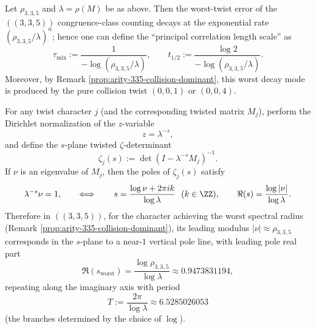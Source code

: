 \begin{remark}\label{cor:arity-335-collision-mixing-scale}
Let \(\rho_{3,3,5}\) and \(\lambda=\rho(M)\) be as above. Then the worst-twist error of the \(((3,3,5))\) congruence-class counting decays at the exponential rate
\(
(\rho_{3,3,5}/\lambda)^n
\);
hence one can define the ``principal correlation length scale'' as
$$
\tau_{\mathrm{mix}}:=\frac{1}{-\log(\rho_{3,3,5}/\lambda)},
\qquad
t_{1/2}:=\frac{\log 2}{-\log(\rho_{3,3,5}/\lambda)}.
$$
Moreover, by Remark \ref{prop:arity-335-collision-dominant}, this worst decay mode is produced by the pure collision twist $(0,0,1)$ or $(0,0,4)$.
\end{remark}

\begin{remark}\label{rem:arity-335-near1-pole-line}
For any twist character \(j\) (and the corresponding twisted matrix \(M_j\)), perform the Dirichlet normalization of the \(z\)-variable
\[
z=\lambda^{-s},
\]
and define the \(s\)-plane twisted \(\zeta\)-determinant
\[
\zeta_j(s):=\det(I-\lambda^{-s}M_j)^{-1}.
\]
If \(\nu\) is an eigenvalue of \(M_j\), then the poles of \(\zeta_j(s)\) satisfy
\[
\lambda^{-s}\nu=1,
\qquad\Longleftrightarrow\qquad
s=\frac{\log \nu+2\pi i k}{\log\lambda}\ \ (k\in\ZZ),
\qquad
\Re(s)=\frac{\log|\nu|}{\log\lambda}.
\]
Therefore in \(((3,3,5))\), for the character achieving the worst spectral radius (Remark \ref{prop:arity-335-collision-dominant}), its leading modulus \(|\nu|\approx \rho_{3,3,5}\) corresponds in the \(s\)-plane to a near-\(1\) vertical pole line, with leading pole real part
$$
\Re(s_{\mathrm{worst}})=\frac{\log\rho_{3,3,5}}{\log\lambda}\approx 0.9473831194,
$$
repeating along the imaginary axis with period
$$
T:=\frac{2\pi}{\log\lambda}\approx 6.5285026053
$$
(the branches determined by the choice of \(\log\)).
\end{remark}

